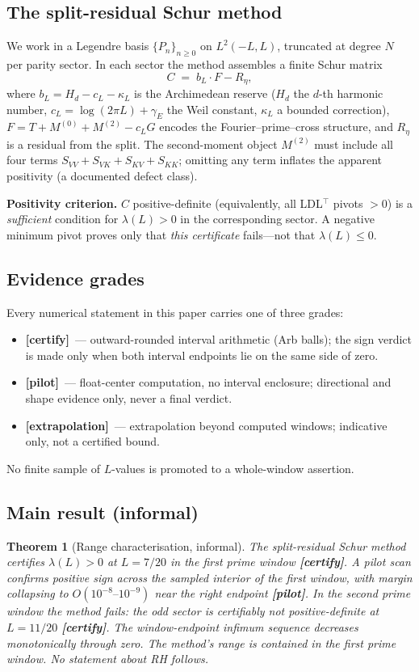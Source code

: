 \documentclass[12pt,a4paper]{amsart}
\theoremstyle{plain}
\newtheorem{theorem}{Theorem}[section]
\theoremstyle{definition}
\newcommand{\cL}{c_L}
\newcommand{\bL}{b_L}
\newcommand{\certify}{\textbf{[certify]}}
\newcommand{\pilot}{\textbf{[pilot]}}
\newcommand{\extrap}{\textbf{[extrapolation]}}
\begin{document}
\subsection{The split-residual Schur method}

We work in a Legendre basis $\{P_n\}_{n \ge 0}$ on $L^2(-L,L)$, truncated
at degree $N$ per parity sector.  In each sector the method assembles a
finite Schur matrix
\[
  C \;=\; \bL \cdot F - R_\eta,
\]
where $\bL = H_d - \cL - \kappa_L$ is the Archimedean reserve ($H_d$ the
$d$-th harmonic number, $\cL = \log(2\pi L)+\gamma_E$ the Weil constant,
$\kappa_L$ a bounded correction), $F = T + M^{(0)} + M^{(2)} - \cL G$ encodes
the Fourier--prime--cross structure, and $R_\eta$ is a residual from the
split.  The second-moment object $M^{(2)}$ must include all four terms
$S_{VV}+S_{VK}+S_{KV}+S_{KK}$; omitting any term inflates the apparent
positivity (a documented defect class).

\textbf{Positivity criterion.}  $C$ positive-definite (equivalently, all
LDL$^\top$ pivots $> 0$) is a \emph{sufficient} condition for $\lambda(L) > 0$
in the corresponding sector.  A negative minimum pivot proves only that
\emph{this certificate} fails---not that $\lambda(L) \le 0$.

\subsection{Evidence grades}

Every numerical statement in this paper carries one of three grades:
\begin{itemize}[leftmargin=2em]
  \item \certify\ --- outward-rounded interval arithmetic (Arb balls); the
    sign verdict is made only when both interval endpoints lie on the same
    side of zero.
  \item \pilot\ --- float-center computation, no interval enclosure;
    directional and shape evidence only, never a final verdict.
  \item \extrap\ --- extrapolation beyond computed windows; indicative
    only, not a certified bound.
\end{itemize}
No finite sample of $L$-values is promoted to a whole-window assertion.

\subsection{Main result (informal)}

\begin{theorem}[Range characterisation, informal]
\label{thm:main-informal}
The split-residual Schur method certifies $\lambda(L) > 0$ at $L=7/20$ in
the first prime window \certify.  A pilot scan confirms positive sign across
the sampled interior of the first window, with margin collapsing to
$O(10^{-8}\text{--}10^{-9})$ near the right endpoint \pilot.  In the second
prime window the method fails: the odd sector is certifiably not
positive-definite at $L=11/20$ \certify.  The window-endpoint infimum
sequence decreases monotonically through zero.  The method's range is
contained in the first prime window.  No statement about RH follows.
\end{theorem}
\end{document}

